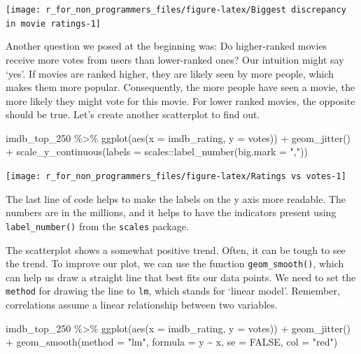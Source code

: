 \documentclass[
]{book}
\newenvironment{Shaded}{\begin{snugshade}}{\end{snugshade}}
\newcommand{\AttributeTok}[1]{\textcolor[rgb]{0.77,0.63,0.00}{#1}}
\newcommand{\ConstantTok}[1]{\textcolor[rgb]{0.00,0.00,0.00}{#1}}
\newcommand{\FunctionTok}[1]{\textcolor[rgb]{0.00,0.00,0.00}{#1}}
\newcommand{\NormalTok}[1]{#1}
\newcommand{\SpecialCharTok}[1]{\textcolor[rgb]{0.00,0.00,0.00}{#1}}
\newcommand{\StringTok}[1]{\textcolor[rgb]{0.31,0.60,0.02}{#1}}
\begin{document}
\begin{center}\texttt{[image: r\_for\_non\_programmers\_files/figure-latex/Biggest discrepancy in movie ratings-1]} \end{center}

Another question we posed at the beginning was: Do higher-ranked movies receive more votes from users than lower-ranked ones? Our intuition might say `yes'. If movies are ranked higher, they are likely seen by more people, which makes them more popular. Consequently, the more people have seen a movie, the more likely they might vote for this movie. For lower ranked movies, the opposite should be true. Let's create another scatterplot to find out.

\begin{Shaded}
\begin{Highlighting}[]
\NormalTok{imdb\_top\_250 }\SpecialCharTok{\%\textgreater{}\%}
  \FunctionTok{ggplot}\NormalTok{(}\FunctionTok{aes}\NormalTok{(}\AttributeTok{x =}\NormalTok{ imdb\_rating, }\AttributeTok{y =}\NormalTok{ votes)) }\SpecialCharTok{+}
  \FunctionTok{geom\_jitter}\NormalTok{() }\SpecialCharTok{+}
  \FunctionTok{scale\_y\_continuous}\NormalTok{(}\AttributeTok{labels =}\NormalTok{ scales}\SpecialCharTok{::}\FunctionTok{label\_number}\NormalTok{(}\AttributeTok{big.mark =} \StringTok{","}\NormalTok{))}
\end{Highlighting}
\end{Shaded}

\begin{center}\texttt{[image: r\_for\_non\_programmers\_files/figure-latex/Ratings vs votes-1]} \end{center}

The last line of code helps to make the labels on the y axis more readable. The numbers are in the millions, and it helps to have the indicators present using \texttt{label\_number()} from the \texttt{scales} package.

The scatterplot shows a somewhat positive trend. Often, it can be tough to see the trend. To improve our plot, we can use the function \texttt{geom\_smooth()}, which can help us draw a straight line that best fits our data points. We need to set the \texttt{method} for drawing the line to \texttt{lm}, which stands for `linear model'. Remember, correlations assume a linear relationship between two variables.

\begin{Shaded}
\begin{Highlighting}[]
\NormalTok{imdb\_top\_250 }\SpecialCharTok{\%\textgreater{}\%}
  \FunctionTok{ggplot}\NormalTok{(}\FunctionTok{aes}\NormalTok{(}\AttributeTok{x =}\NormalTok{ imdb\_rating, }\AttributeTok{y =}\NormalTok{ votes)) }\SpecialCharTok{+}
  \FunctionTok{geom\_jitter}\NormalTok{() }\SpecialCharTok{+}
  \FunctionTok{geom\_smooth}\NormalTok{(}\AttributeTok{method =} \StringTok{"lm"}\NormalTok{,}
              \AttributeTok{formula =}\NormalTok{ y }\SpecialCharTok{\textasciitilde{}}\NormalTok{ x,}
              \AttributeTok{se =} \ConstantTok{FALSE}\NormalTok{,}
              \AttributeTok{col =} \StringTok{"red"}\NormalTok{)}
\end{Highlighting}
\end{Shaded}
\end{document}
